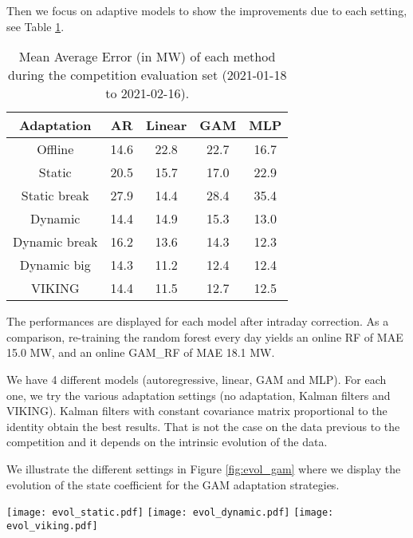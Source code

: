 \documentclass[transmag]{IEEEtran}
\begin{document}
Then we focus on adaptive models to show the improvements due to each setting, see Table \ref{tab:individual}.
\begin{table}[]
    \begin{center}
    \caption{Mean Average Error (in MW) of each method during the competition evaluation set (2021-01-18 to 2021-02-16).}
    \label{tab:individual}
    \begin{tabular}{|c|c|c|c|c|}
        \hline
        Adaptation & AR & Linear & GAM & MLP \\
        \hline
        Offline & 14.6 & 22.8 & 22.7 & 16.7 \\
        \hline
        Static & 20.5 & 15.7 & 17.0 & 22.9 \\
        Static break & 27.9 & 14.4 & 28.4 & 35.4 \\
        Dynamic & 14.4 & 14.9 & 15.3 & 13.0 \\
        Dynamic break & 16.2 & 13.6 & 14.3 & 12.3 \\
        Dynamic big & 14.3 & 11.2 & 12.4 & 12.4 \\
        \hline
        VIKING & 14.4 & 11.5 & 12.7 & 12.5 \\
        \hline
    \end{tabular}
    \end{center}
    The performances are displayed for each model after intraday correction. As a comparison, re-training the random forest every day yields an online RF of MAE 15.0 MW, and an online GAM\_RF of MAE 18.1 MW.
\end{table}
We have 4 different models (autoregressive, linear, GAM and MLP). For each one, we try the various adaptation settings (no adaptation, Kalman filters and VIKING). Kalman filters with constant covariance matrix proportional to the identity obtain the best results. That is not the case on the data previous to the competition and it depends on the intrinsic evolution of the data.

We illustrate the different settings in Figure \ref{fig:evol_gam} where we display the evolution of the state coefficient for the GAM adaptation strategies.
\begin{figure*}
    \centering
    \texttt{[image: evol\_static.pdf]}
    \texttt{[image: evol\_dynamic.pdf]}
    \texttt{[image: evol\_viking.pdf]}
    \caption{Evolution of the state coefficients for various adaptations of the GAM, see Section \ref{sec:adaptation}. On the left, we use the Kalman Filter in the static setting (degenerate covariance matrix $Q_t=0$). On the middle, the dynamic setting where the variances are constant, and we provide the ratio $Q/\sigma^2=diag(2^{-17},0,2^{-8},2^{-16},2^{-14},0,0)$: we observe that the coefficient corresponding to the biggest coefficient of $Q$ (the effect of $Temps95$) evolves much faster. On the right, the VIKING setting where we estimate the variances adaptively.}
    \label{fig:evol_gam}
\end{figure*}
\end{document}
